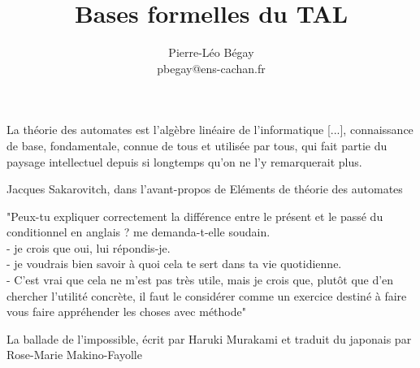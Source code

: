 \documentclass{report}
\title{Bases formelles du TAL}
\author{Pierre-Léo Bégay \\ pbegay@ens-cachan.fr}
\theoremstyle{slanted}
\begin{document}
\maketitle

\epigraph{La théorie des automates est l'algèbre linéaire de l'informatique [...], connaissance de base, fondamentale, connue de tous et utilisée par tous, qui fait partie du paysage intellectuel depuis si longtemps qu'on ne l'y remarquerait plus.}{Jacques Sakarovitch, dans l'avant-propos de Eléments de théorie des automates}

\epigraph{"Peux-tu expliquer correctement la différence entre le présent et le passé du conditionnel en anglais ? me demanda-t-elle soudain. \\
    - je crois que oui, lui répondis-je. \\
    - je voudrais bien savoir à quoi cela te sert dans ta vie quotidienne. \\
    - C'est vrai que cela ne m'est pas très utile, mais je crois que, plutôt que d'en chercher l'utilité concrète, il faut le considérer comme un exercice destiné à faire vous faire appréhender les choses avec méthode"}{La ballade de l'impossible, écrit par Haruki Murakami et traduit du japonais par Rose-Marie Makino-Fayolle}



\tableofcontents

















\appendix


\end{document}
